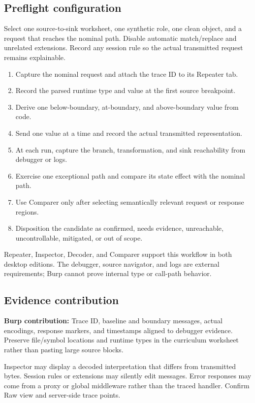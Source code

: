 \documentclass[11pt]{article}
\newcommand{\weekfield}[2]{%
  \Needspace{5\baselineskip}
  \subsection*{#1}
  #2
}
\newcommand{\burpevidence}[1]{\textbf{Burp contribution:} #1}
\begin{document}
\weekfield{Preflight configuration}{Select one source-to-sink worksheet, one
synthetic role, one clean object, and a request that reaches the nominal path.
Disable automatic match/replace and unrelated extensions. Record any session
rule so the actual transmitted request remains explainable.}

\begin{procedurebox}
\begin{enumerate}
  \item Capture the nominal request and attach the trace ID to its Repeater tab.
  \item Record the parsed runtime type and value at the first source breakpoint.
  \item Derive one below-boundary, at-boundary, and above-boundary value from code.
  \item Send one value at a time and record the actual transmitted representation.
  \item At each run, capture the branch, transformation, and sink reachability from debugger or logs.
  \item Exercise one exceptional path and compare its state effect with the nominal path.
  \item Use Comparer only after selecting semantically relevant request or response regions.
  \item Disposition the candidate as confirmed, needs evidence, unreachable, uncontrollable, mitigated, or out of scope.
\end{enumerate}
\end{procedurebox}

\begin{editionbox}
Repeater, Inspector, Decoder, and Comparer support this workflow in both desktop
editions. The debugger, source navigator, and logs are external requirements;
Burp cannot prove internal type or call-path behavior.
\end{editionbox}

\weekfield{Evidence contribution}{\burpevidence{Trace ID, baseline and boundary
messages, actual encodings, response markers, and timestamps aligned to debugger
evidence.} Preserve file/symbol locations and runtime types in the curriculum
worksheet rather than pasting large source blocks.}

\begin{troubleshootingbox}
Inspector may display a decoded interpretation that differs from transmitted
bytes. Session rules or extensions may silently edit messages. Error responses
may come from a proxy or global middleware rather than the traced handler.
Confirm Raw view and server-side trace points.
\end{troubleshootingbox}
\end{document}
